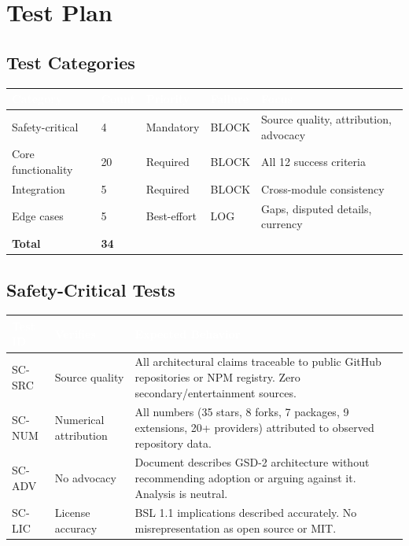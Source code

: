 \documentclass[11pt,letterpaper]{article}
\newcommand{\tableheader}[1]{\textbf{\sffamily\textcolor{white}{#1}}}
\begin{document}
\section{Test Plan}

\subsection{Test Categories}

\begin{center}
\begin{tabularx}{\textwidth}{L{4cm}C{1.5cm}L{2cm}L{2cm}X}
\toprule
{}
\tableheader{Category} & \tableheader{Count} & \tableheader{Priority} & \tableheader{Failure} & \tableheader{Focus} \\
\midrule
Safety-critical & 4 & Mandatory & BLOCK & Source quality, attribution, advocacy \\
Core functionality & 20 & Required & BLOCK & All 12 success criteria \\
Integration & 5 & Required & BLOCK & Cross-module consistency \\
Edge cases & 5 & Best-effort & LOG & Gaps, disputed details, currency \\
\midrule
\textbf{Total} & \textbf{34} & & & \\
\bottomrule
\end{tabularx}
\end{center}

\subsection{Safety-Critical Tests}

\begin{center}
\begin{tabularx}{\textwidth}{L{1.5cm}L{5cm}X}
\toprule
{}
\tableheader{Test ID} & \tableheader{Verifies} & \tableheader{Expected Behavior} \\
\midrule
SC-SRC & Source quality & All architectural claims traceable to public GitHub repositories or NPM registry. Zero secondary/entertainment sources. \\
SC-NUM & Numerical attribution & All numbers (35 stars, 8 forks, 7 packages, 9 extensions, 20+ providers) attributed to observed repository data. \\
SC-ADV & No advocacy & Document describes GSD-2 architecture without recommending adoption or arguing against it. Analysis is neutral. \\
SC-LIC & License accuracy & BSL 1.1 implications described accurately. No misrepresentation as open source or MIT. \\
\bottomrule
\end{tabularx}
\end{center}
\end{document}
